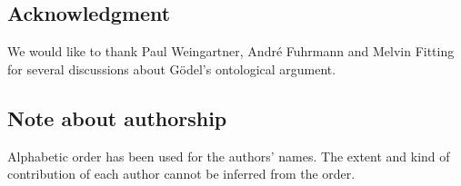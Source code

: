 \documentclass{birkmult}
\theoremstyle{definition}
\theoremstyle{remark}
\numberwithin{equation}{section}
\begin{document}
\subsection*{Acknowledgment}

We would like to thank Paul Weingartner, Andr\'{e} Fuhrmann 
and Melvin Fitting for several discussions about 
G\"odel's ontological argument.


\subsection*{Note about authorship}

Alphabetic order has been used for the authors' names. 
The extent and kind of contribution of each author 
cannot be inferred from the order.



\end{document}
